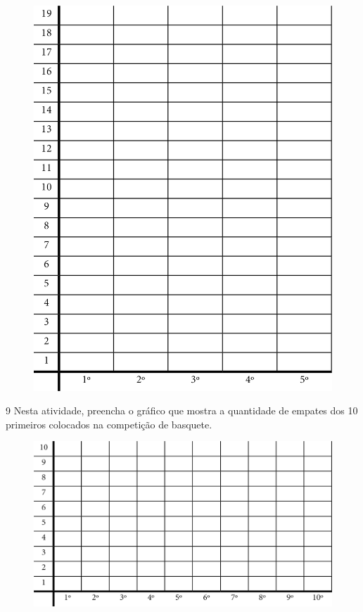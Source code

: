 \begin{figure}[htpb!]
\centering
\includegraphics[width=.8\textwidth]{./media/image96.png}
\end{figure}


\pagebreak
\num{9} Nesta atividade, preencha o gráfico que mostra a quantidade de empates
dos 10 primeiros colocados na competição de basquete.

\begin{figure}[htpb!]
\includegraphics[width=\textwidth]{./media/image97.png}
\end{figure}

